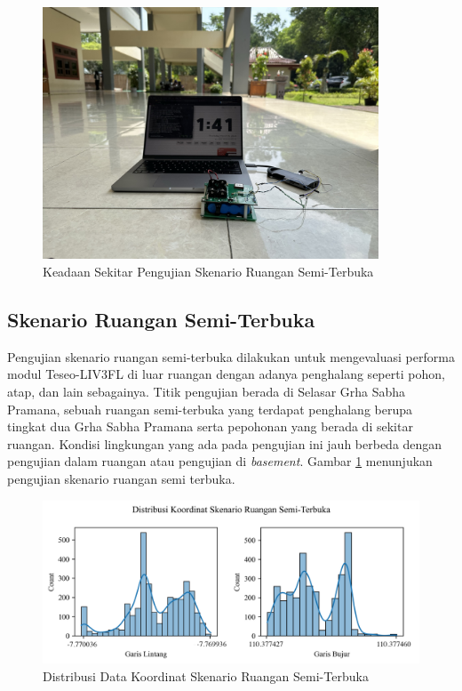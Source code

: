\begin{figure}[H]
	\centering
	\includegraphics[width=10cm]{contents/chapter-4/3-skenario-semioutdoor/keadaan.jpeg}
	\caption{Keadaan Sekitar Pengujian Skenario Ruangan Semi-Terbuka}
	\label{Fig: semioutdoor-keadaan}
\end{figure}

\subsection{Skenario Ruangan Semi-Terbuka}
Pengujian skenario ruangan semi-terbuka dilakukan untuk mengevaluasi performa modul Teseo-LIV3FL di luar ruangan dengan adanya penghalang seperti pohon, atap, dan lain sebagainya. Titik pengujian berada di Selasar Grha Sabha Pramana, sebuah ruangan semi-terbuka yang terdapat penghalang berupa tingkat dua Grha Sabha Pramana serta pepohonan yang berada di sekitar ruangan. Kondisi lingkungan yang ada pada pengujian ini jauh berbeda dengan pengujian dalam ruangan atau pengujian di \textit{basement}. Gambar \ref{Fig: semioutdoor-keadaan} menunjukan pengujian skenario ruangan semi terbuka.

\begin{figure}[H]
	\centering
	\begin{adjustbox}{width=\textwidth}
		\includegraphics{contents/chapter-4/3-skenario-semioutdoor/distribution.png}
	\end{adjustbox}
	\caption{Distribusi Data Koordinat Skenario Ruangan Semi-Terbuka}
	\label{Fig:semioutdoor-distribution}
\end{figure}

